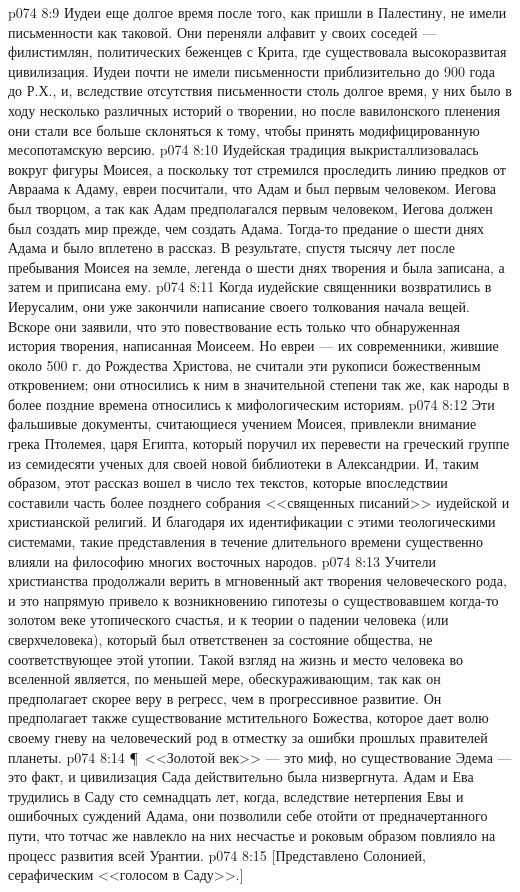 \vs p074 8:9 Иудеи еще долгое время после того, как пришли в Палестину, не имели письменности как таковой. Они переняли алфавит у своих соседей --- филистимлян, политических беженцев с Крита, где существовала высокоразвитая цивилизация. Иудеи почти не имели письменности приблизительно до 900 года до Р.Х., и, вследствие отсутствия письменности столь долгое время, у них было в ходу несколько различных историй о творении, но после вавилонского пленения они стали все больше склоняться к тому, чтобы принять модифицированную месопотамскую версию.
\vs p074 8:10 Иудейская традиция выкристаллизовалась вокруг фигуры Моисея, а поскольку тот стремился проследить линию предков от Авраама к Адаму, евреи посчитали, что Адам и был первым человеком. Иегова был творцом, а так как Адам предполагался первым человеком, Иегова должен был создать мир прежде, чем создать Адама. Тогда\hyp{}то предание о шести днях Адама и было вплетено в рассказ. В результате, спустя тысячу лет после пребывания Моисея на земле, легенда о шести днях творения и была записана, а затем и приписана ему.
\vs p074 8:11 Когда иудейские священники возвратились в Иерусалим, они уже закончили написание своего толкования начала вещей. Вскоре они заявили, что это повествование есть только что обнаруженная история творения, написанная Моисеем. Но евреи --- их современники, жившие около 500 г. до Рождества Христова, не считали эти рукописи божественным откровением; они относились к ним в значительной степени так же, как народы в более поздние времена относились к мифологическим историям.
\vs p074 8:12 Эти фальшивые документы, считающиеся учением Моисея, привлекли внимание грека Птолемея, царя Египта, который поручил их перевести на греческий группе из семидесяти ученых для своей новой библиотеки в Александрии. И, таким образом, этот рассказ вошел в число тех текстов, которые впоследствии составили часть более позднего собрания <<священных писаний>> иудейской и христианской религий. И благодаря их идентификации с этими теологическими системами, такие представления в течение длительного времени существенно влияли на философию многих восточных народов.
\vs p074 8:13 Учители христианства продолжали верить в мгновенный акт творения человеческого рода, и это напрямую привело к возникновению гипотезы о существовавшем когда\hyp{}то золотом веке утопического счастья, и к теории о падении человека (или сверхчеловека), который был ответственен за состояние общества, не соответствующее этой утопии. Такой взгляд на жизнь и место человека во вселенной является, по меньшей мере, обескураживающим, так как он предполагает скорее веру в регресс, чем в прогрессивное развитие. Он предполагает также существование мстительного Божества, которое дает волю своему гневу на человеческий род в отместку за ошибки прошлых правителей планеты.
\vs p074 8:14 \P\ <<Золотой век>> --- это миф, но существование Эдема --- это факт, и цивилизация Сада действительно была низвергнута. Адам и Ева трудились в Саду сто семнадцать лет, когда, вследствие нетерпения Евы и ошибочных суждений Адама, они позволили себе отойти от предначертанного пути, что тотчас же навлекло на них несчастье и роковым образом повлияло на процесс развития всей Урантии.
\vs p074 8:15 [Представлено Солонией, серафическим <<голосом в Саду>>.]
